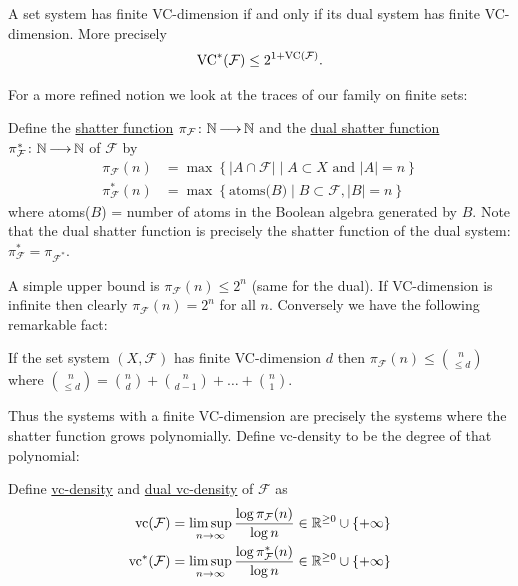 \documentclass{amsart}
\newcommand{\F}{\mathcal F}
\newcommand{\defn}{\underline}
\newcommand{\curly}[1]{\left\{#1\right\}}
\begin{document}
\begin{Lemma}
  A set system has finite VC-dimension if and only if its dual system has finite VC-dimension.
  More precisely
  \begin{align*}
    \VC^*(\F) \leq 2^{1+\VC(\F)}.
  \end{align*}
\end{Lemma}

For a more refined notion we look at the traces of our family on finite sets:
\begin{Definition}
  Define the \defn{shatter function} $\pi_\F \colon \N \arr \N$ and the \defn{dual shatter function} $\pi^*_\F \colon \N \arr \N$ of $\F$ by 
  \begin{align*}
    \pi_\F(n) &= \max \curly{|A \cap \F| \mid A \subset X \text{ and } |A| = n} \\
    \pi^*_\F(n) &= \max \curly{\text{atoms($B$)} \mid B \subset \F, |B| = n}
  \end{align*}
  where atoms($B$) = number of atoms in the Boolean algebra generated by $B$.
  Note that the dual shatter function is precisely the shatter function of the dual system: $\pi^*_\F = \pi_{\F^*}$.
\end{Definition}  

A simple upper bound is $\pi_\F(n) \leq 2^n$ (same for the dual).
If VC-dimension is infinite then clearly $\pi_\F(n) = 2^n$ for all $n$. Conversely we have the following remarkable fact:
\begin{Theorem} 
  If the set system $(X, \F)$ has finite VC-dimension $d$ then $\pi_\F(n) \leq {n \choose \leq d}$ where
  ${n \choose \leq d} = {n \choose d} + {n \choose d - 1} + \ldots + {n \choose 1}$.    
\end{Theorem}

Thus the systems with a finite VC-dimension are precisely the systems where the shatter function grows polynomially.
Define vc-density to be the degree of that polynomial:
\begin{Definition}
  Define \defn{vc-density} and \defn{dual vc-density} of $\F$ as
  \begin{align*}
    \vc(\F) &= \limsup_{n \to \infty}\frac{\log \pi_\F(n)}{\log n} \in \R^{\geq 0} \cup \curly{+\infty}\\
    \vc^*(\F) &= \limsup_{n \to \infty}\frac{\log \pi^*_\F(n)}{\log n}\in \R^{\geq 0} \cup \curly{+\infty}
  \end{align*}
\end{Definition}
\end{document}
